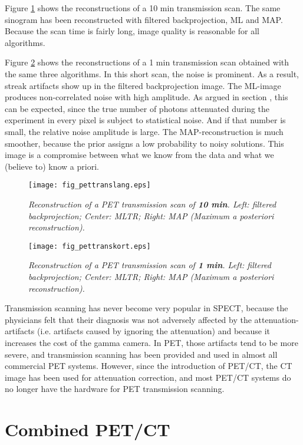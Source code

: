 Figure \ref{fig:pettranslang} shows the reconstructions of a 10 min
transmission scan. The same sinogram has been reconstructed with filtered
backprojection, ML and MAP. Because the scan time is fairly long, image
quality is reasonable for all algorithms.

Figure \ref{fig:pettranskort} shows the reconstructions of a 1 min
transmission scan obtained with the same three algorithms. In this short scan,
the noise is prominent. As a result, streak artifacts show up in the filtered
backprojection image. The ML-image produces non-correlated noise with high
amplitude. As argued in section , this can be expected,
since the true number of photons attenuated during the experiment in every
pixel is subject to statistical noise. And if that number is small, the
relative noise amplitude is large. The MAP-reconstruction is much smoother,
because the prior assigns a low probability to noisy solutions. This image is
a compromise between what we know from the data and what we (believe to) know
a priori.

\begin{figure}[tb]
\centering
\texttt{[image: fig\_pettranslang.eps]}
\caption{\label{fig:pettranslang} \emph{Reconstruction of a PET transmission
scan of {\bf 10 min}. Left: filtered backprojection; Center: MLTR; Right: MAP
(Maximum a posteriori reconstruction).}}
\end{figure}

\begin{figure}[tb]
\centering
\texttt{[image: fig\_pettranskort.eps]}
\caption{\label{fig:pettranskort} \emph{Reconstruction of a PET transmission
scan of {\bf 1 min}. Left: filtered backprojection; Center: MLTR; Right: MAP
(Maximum a posteriori reconstruction).}}
\end{figure}

Transmission scanning has never become very popular in SPECT, because
the physicians felt that their diagnosis was not adversely affected by
the attenuation-artifacts (i.e. artifacts caused by ignoring the
attenuation) and because it increases the cost of the gamma camera. In
PET, those artifacts tend to be more severe, and transmission scanning
has been provided and used in almost all commercial PET
systems. However, since the introduction of PET/CT, the CT image has
been used for attenuation correction, and most PET/CT systems do no
longer have the hardware for PET transmission scanning.

\section{Combined PET/CT}
